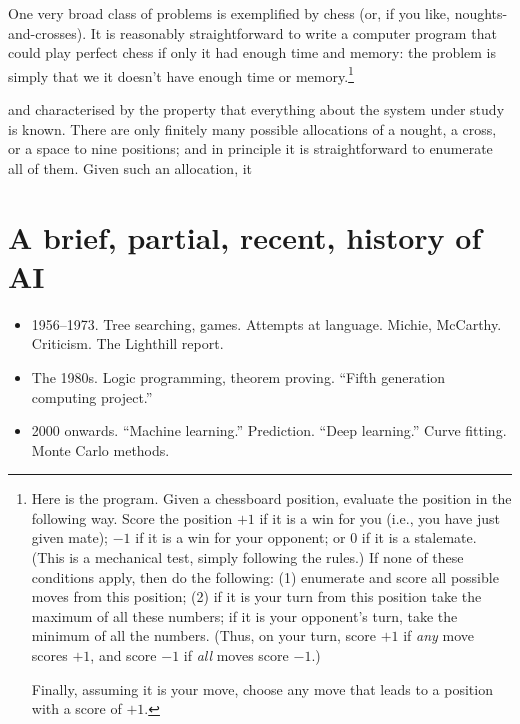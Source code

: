 \documentclass[10pt, a4paper, twocolumn]{article}
\begin{document}
One very broad class of problems is exemplified by chess (or, if you like,
noughts-and-crosses). It is reasonably straightforward to write a computer
program that could play perfect chess if only it had enough time and memory: the
problem is simply that we it doesn't have enough time or memory.\footnote{Here
  is the program. Given a chessboard position, evaluate the position in the
  following way. Score the position $+1$ if it is a win for you (i.e., you have
  just given mate); $-1$ if it is a win for your opponent; or $0$ if it is a
  stalemate. (This is a mechanical test, simply following the rules.) If none of
  these conditions apply, then do the following: (1) enumerate and score all
  possible moves from this position; (2) if it is your turn from this position
  take the maximum of all these numbers; if it is your opponent's turn, take the
  minimum of all the numbers. (Thus, on your turn, score $+1$ if \emph{any} move
  scores $+1$, and score $-1$ if \emph{all} moves score $-1$.)

  Finally, assuming it is your move, choose any move that leads to a position
  with a score of $+1$.}

and characterised by the property that everything about the
system under study is known. There are only finitely many possible allocations
of a nought, a cross, or a space to nine positions; and in principle it is
straightforward to enumerate all of them. Given such an allocation, it






\section{A brief, partial, recent, history of AI}

\begin{itemize}
\item 1956–1973. Tree searching, games. Attempts at language. Michie,
  McCarthy. Criticism. The Lighthill report. 
\item The 1980s. Logic programming, theorem proving. ``Fifth generation
  computing project.'' 
\item 2000 onwards. ``Machine learning.'' Prediction. ``Deep learning.'' Curve
  fitting. Monte Carlo methods.
\end{itemize}




\printbibliography%
\end{document}
